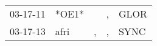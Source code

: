 \begin{supertabular}{lllll}
 03-17-11 &  *OE1* &    &  , &  GLOR \\
 03-17-13 &   afri &  , &  , &  SYNC \\
\end{supertabular}
